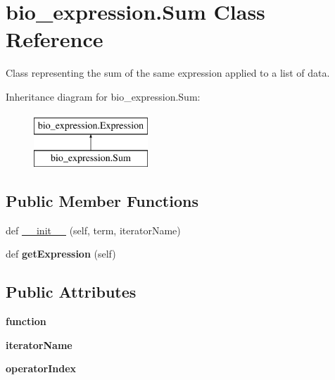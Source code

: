 \hypertarget{classbio__expression_1_1_sum}{}\section{bio\+\_\+expression.\+Sum Class Reference}
\label{classbio__expression_1_1_sum}


Class representing the sum of the same expression applied to a list of data.  


Inheritance diagram for bio\+\_\+expression.\+Sum\+:\begin{figure}[H]
\begin{center}
\leavevmode
\includegraphics[height=2.000000cm]{classbio__expression_1_1_sum}
\end{center}
\end{figure}
\subsection*{Public Member Functions}
\begin{DoxyCompactItemize}
\item 
def \hyperlink{classbio__expression_1_1_sum_ae2d11d597b6117061aba05ab13665f10}{\+\_\+\+\_\+init\+\_\+\+\_\+} (self, term, iterator\+Name)
\item 
def {\bfseries get\+Expression} (self)\hypertarget{classbio__expression_1_1_sum_aec404ecce6ad65af4ae2c89b84361a44}{}\label{classbio__expression_1_1_sum_aec404ecce6ad65af4ae2c89b84361a44}

\end{DoxyCompactItemize}
\subsection*{Public Attributes}
\begin{DoxyCompactItemize}
\item 
{\bfseries function}\hypertarget{classbio__expression_1_1_sum_a9b0f02242bfe80afe341327f79388b87}{}\label{classbio__expression_1_1_sum_a9b0f02242bfe80afe341327f79388b87}

\item 
{\bfseries iterator\+Name}\hypertarget{classbio__expression_1_1_sum_ad7a2c6824d64ea23672b11d9ca471f98}{}\label{classbio__expression_1_1_sum_ad7a2c6824d64ea23672b11d9ca471f98}

\item 
{\bfseries operator\+Index}\hypertarget{classbio__expression_1_1_sum_a739503e877a65edff2e652623635c44d}{}\label{classbio__expression_1_1_sum_a739503e877a65edff2e652623635c44d}

\end{DoxyCompactItemize}


